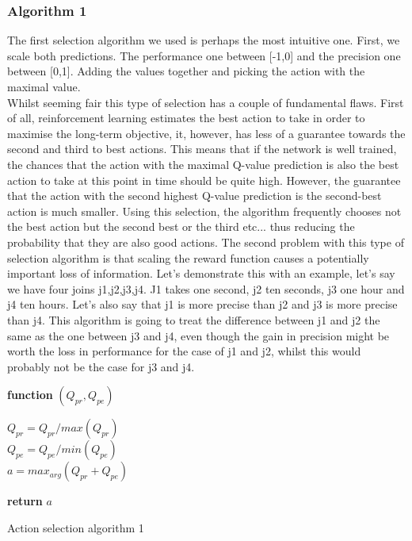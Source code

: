 \subsubsection{Algorithm 1} 
The first selection algorithm we used is perhaps the most intuitive one. First, we scale both predictions. The performance one between [-1,0] and the precision one between [0,1]. Adding the values together and picking the action with the maximal value.\\
Whilst seeming fair this type of selection has a couple of fundamental flaws. First of all, reinforcement learning estimates the best action to take in order to maximise the long-term objective, it, however, has less of a guarantee towards the second and third to best actions. This means that if the network is well trained, the chances that the action with the maximal Q-value prediction is also the best action to take at this point in time should be quite high. However, the guarantee that the action with the second highest Q-value prediction is the second-best action is much smaller. Using this selection, the algorithm frequently chooses not the best action but the second best or the third etc... thus reducing the probability that they are also good actions. The second problem with this type of selection algorithm is that scaling the reward function causes a potentially important loss of information. Let's demonstrate this with an example, let's say we have four joins j1,j2,j3,j4. J1 takes one second, j2 ten seconds, j3 one hour and j4 ten hours. Let's also say that j1 is more precise than j2 and j3 is more precise than j4. This algorithm is going to treat the difference between j1 and j2 the same as the one between j3 and j4, even though the gain in precision might be worth the loss in performance for the case of j1 and j2, whilst this would probably not be the case for j3 and j4.
\begin{center}
\begin{algorithm}[H]

    \textbf{function}  $(Q_{pr},Q_{pe})$\;
    
    
    \Indp{}\Indm
    \Indp{} \Indm
    \Indp
    $Q_{pr} = Q_{pr}/max(Q_{pr})$\\
    $Q_{pe} = Q_{pe}/min(Q_{pe})$\\
    $a = max_{arg}(Q_{pr}+Q_{pe})$
    
  
   \textbf{return} $a$

\caption{Action selection algorithm 1}
\end{algorithm}
\end{center}
